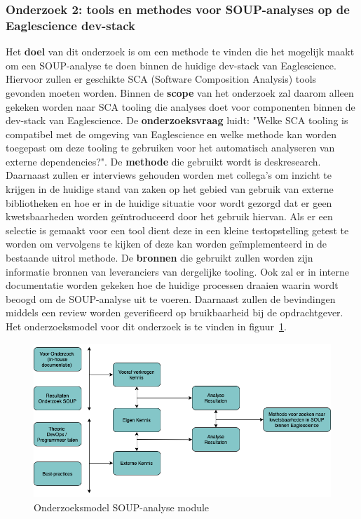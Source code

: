 \subsubsection{Onderzoek 2: tools en methodes voor SOUP-analyses op de Eaglescience dev-stack}
Het \textbf{doel} van dit onderzoek is om een methode te vinden die het mogelijk maakt om een SOUP-analyse te doen binnen de huidige dev-stack van Eaglescience. Hiervoor zullen er geschikte SCA (Software Composition Analysis) tools gevonden moeten worden. Binnen de \textbf{scope} van het onderzoek zal daarom alleen gekeken worden naar SCA tooling die analyses doet voor componenten binnen de dev-stack van Eaglescience. De \textbf{onderzoeksvraag} luidt: "Welke SCA tooling is compatibel met de omgeving van Eaglescience en welke methode kan worden toegepast om deze tooling te gebruiken voor het automatisch analyseren van externe dependencies?". De \textbf{methode} die gebruikt wordt is deskresearch. Daarnaast zullen er interviews gehouden worden met collega's om inzicht te krijgen in de huidige stand van zaken op het gebied van gebruik van externe bibliotheken en hoe er in de huidige situatie voor wordt gezorgd dat er geen kwetsbaarheden worden geïntroduceerd door het gebruik hiervan. Als er een selectie is gemaakt voor een tool dient deze in een kleine testopstelling getest te worden om vervolgens te kijken of deze kan worden geïmplementeerd in de bestaande uitrol methode. De \textbf{bronnen} die gebruikt zullen worden zijn informatie bronnen van leveranciers van dergelijke tooling. Ook zal er in interne documentatie worden gekeken hoe de huidige processen draaien waarin wordt beoogd om de SOUP-analyse uit te voeren. Daarnaast zullen de bevindingen middels een review worden geverifieerd op bruikbaarheid bij de opdrachtgever. Het onderzoeksmodel voor dit onderzoek is te vinden in figuur~\ref{fig:OnderzoeksModelSOUPmethode}.

\begin{figure}[htbp]
    \myfloatalign
    \includegraphics[width=12cm]{gfx/OnderzoeksModelSOUPMethode}
    \caption{Onderzoeksmodel SOUP-analyse module}
    \label{fig:OnderzoeksModelSOUPmethode}
\end{figure}

